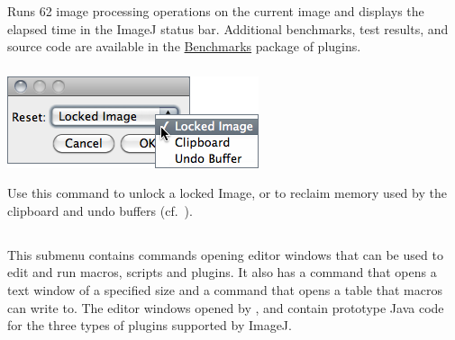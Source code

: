 \subsubsection{\protect{}\label{sub:Benchmark}}

Runs 62 image processing operations on the current image and displays
the elapsed time in the ImageJ status bar. Additional benchmarks,
test results, and source code are available in the \href{http://imagej.nih.gov/ij/plugins/benchmarks.html}{Benchmarks}
package of plugins.




\subsubsection{\protect{}\label{sub:Reset...}}

\begin{minipage}[c][1\totalheight][t]{0.395\columnwidth}%
\includegraphics[scale=0.55]{images/Reset}%
\end{minipage}%
\begin{minipage}[c][1\totalheight][t]{0.605\columnwidth}%
Use this command to unlock a locked Image, or to reclaim memory used
by the clipboard and undo buffers (cf.\ ).


%
\end{minipage}


\subsection{\protect{}\label{sub:Plugins->New}}

This submenu contains commands opening editor windows that can be
used to edit and run macros, scripts and plugins. It also has a command
that opens a text window of a specified size and a command that opens
a table that macros can write to. The editor windows opened by ,
 and  contain
prototype Java code for the three types of plugins supported by ImageJ.


